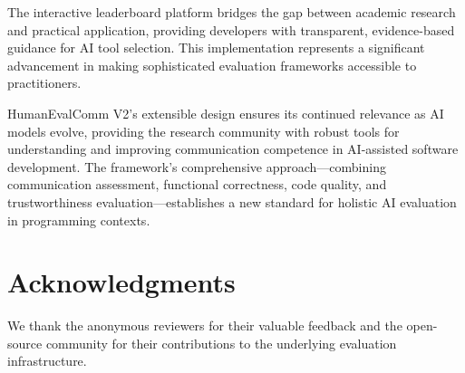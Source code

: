 \documentclass[conference]{IEEEtran}
\begin{document}
The interactive leaderboard platform bridges the gap between academic research and practical application, providing developers with transparent, evidence-based guidance for AI tool selection. This implementation represents a significant advancement in making sophisticated evaluation frameworks accessible to practitioners.

HumanEvalComm V2's extensible design ensures its continued relevance as AI models evolve, providing the research community with robust tools for understanding and improving communication competence in AI-assisted software development. The framework's comprehensive approach—combining communication assessment, functional correctness, code quality, and trustworthiness evaluation—establishes a new standard for holistic AI evaluation in programming contexts.

\section*{Acknowledgments}

We thank the anonymous reviewers for their valuable feedback and the open-source community for their contributions to the underlying evaluation infrastructure.



\end{document}
